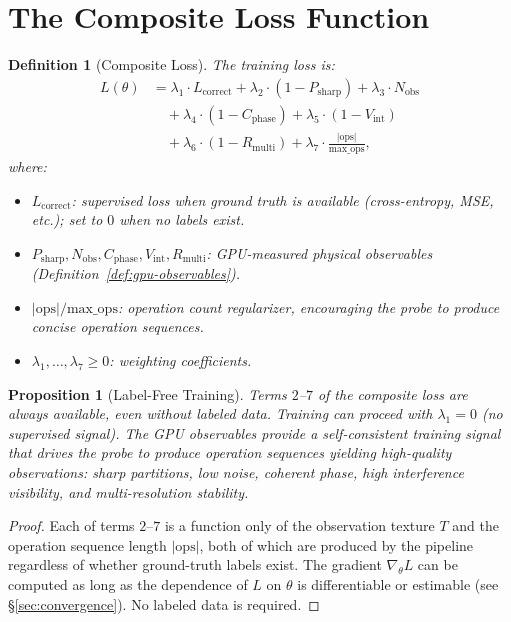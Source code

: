\documentclass[11pt,twocolumn,a4paper]{article}
\newtheorem{proposition}[theorem]{Proposition}
\newtheorem{definition}[theorem]{Definition}
\begin{document}
\section{The Composite Loss Function}
\label{sec:loss}

\begin{definition}[Composite Loss]
\label{def:composite-loss}
The training loss is:
\begin{align}
L(\theta) &= \lambda_1 \cdot L_{\mathrm{correct}}
  + \lambda_2 \cdot (1 - P_{\mathrm{sharp}})
  + \lambda_3 \cdot N_{\mathrm{obs}} \nonumber\\
&\quad + \lambda_4 \cdot (1 - C_{\mathrm{phase}})
  + \lambda_5 \cdot (1 - V_{\mathrm{int}}) \nonumber\\
&\quad + \lambda_6 \cdot (1 - R_{\mathrm{multi}})
  + \lambda_7 \cdot \frac{|\text{ops}|}{\text{max\_ops}},
\label{eq:loss}
\end{align}
where:
\begin{itemize}[leftmargin=*]
\item $L_{\mathrm{correct}}$: supervised loss when ground truth is
  available (cross-entropy, MSE, etc.); set to $0$ when no labels
  exist.
\item $P_{\mathrm{sharp}}, N_{\mathrm{obs}}, C_{\mathrm{phase}},
  V_{\mathrm{int}}, R_{\mathrm{multi}}$: GPU-measured physical
  observables (Definition~\ref{def:gpu-observables}).
\item $|\text{ops}|/\text{max\_ops}$: operation count regularizer,
  encouraging the probe to produce concise operation sequences.
\item $\lambda_1, \ldots, \lambda_7 \geq 0$: weighting
  coefficients.
\end{itemize}
\end{definition}

\begin{proposition}[Label-Free Training]
\label{prop:label-free}
Terms $2$--$7$ of the composite loss are always available, even
without labeled data. Training can proceed with $\lambda_1 = 0$
(no supervised signal). The GPU observables provide a
self-consistent training signal that drives the probe to produce
operation sequences yielding high-quality observations: sharp
partitions, low noise, coherent phase, high interference
visibility, and multi-resolution stability.
\end{proposition}

\begin{proof}
Each of terms $2$--$7$ is a function only of the observation texture
$T$ and the operation sequence length $|\text{ops}|$, both of which
are produced by the pipeline regardless of whether ground-truth labels
exist. The gradient $\nabla_\theta L$ can be computed as long as the
dependence of $L$ on $\theta$ is differentiable or estimable (see
\S\ref{sec:convergence}). No labeled data is required. \qedhere
\end{proof}
\end{document}
